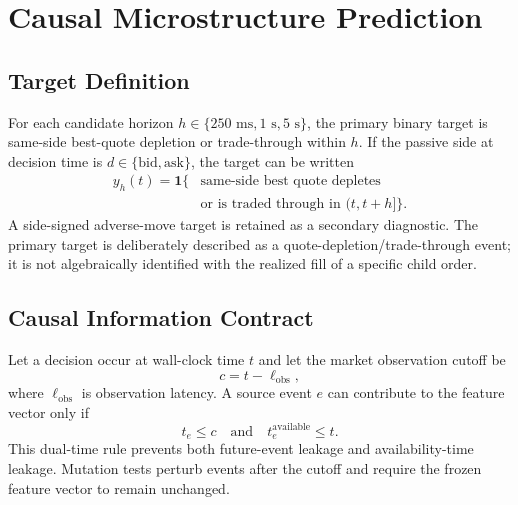 \documentclass[journal,10pt]{IEEEtran}
\newcommand{\1}{\mathbf{1}}
\begin{document}
\section{Causal Microstructure Prediction}
\label{sec:prediction}
\subsection{Target Definition}
For each candidate horizon $h\in\{250\text{ ms},1\text{ s},5\text{ s}\}$, the primary binary target is same-side best-quote depletion or trade-through within $h$. If the passive side at decision time is $d\in\{\mathrm{bid},\mathrm{ask}\}$, the target can be written
\begin{align}
y_h(t)=\1\{&\text{same-side best quote depletes} \nonumber\\
             &\text{or is traded through in }(t,t+h]\}.
\label{eq:target}
\end{align}
A side-signed adverse-move target is retained as a secondary diagnostic. The primary target is deliberately described as a quote-depletion/trade-through event; it is not algebraically identified with the realized fill of a specific child order.

\subsection{Causal Information Contract}
Let a decision occur at wall-clock time $t$ and let the market observation cutoff be
\begin{equation}
c=t-\ell_{\mathrm{obs}},
\end{equation}
where $\ell_{\mathrm{obs}}$ is observation latency. A source event $e$ can contribute to the feature vector only if
\begin{equation}
t_e\le c \quad \text{and}\quad t^{\mathrm{available}}_e\le t.
\label{eq:causality}
\end{equation}
This dual-time rule prevents both future-event leakage and availability-time leakage. Mutation tests perturb events after the cutoff and require the frozen feature vector to remain unchanged.
\end{document}
